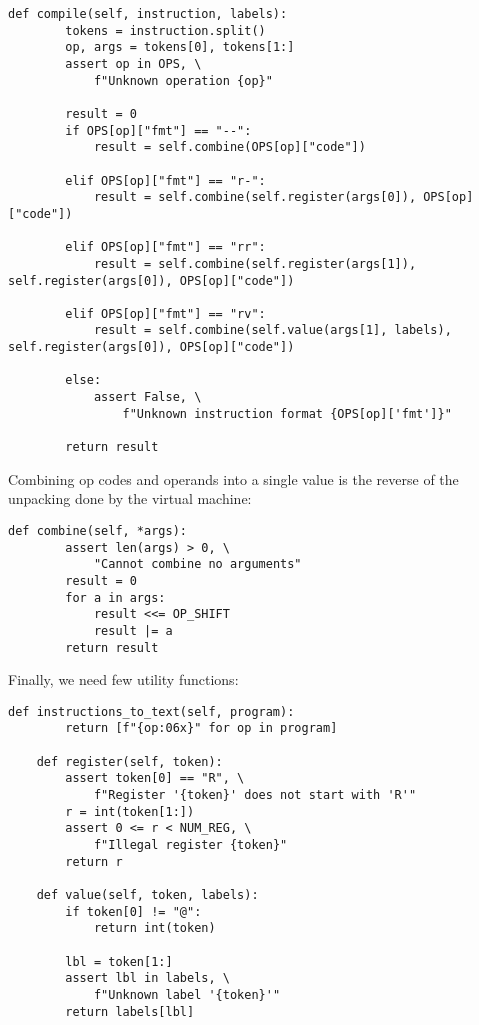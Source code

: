 \documentclass{scrbook}
\begin{document}
\begin{lstlisting}[frame=single,frameround=tttt]
    def compile(self, instruction, labels):
        tokens = instruction.split()
        op, args = tokens[0], tokens[1:]
        assert op in OPS, \
            f"Unknown operation {op}"

        result = 0
        if OPS[op]["fmt"] == "--":
            result = self.combine(OPS[op]["code"])

        elif OPS[op]["fmt"] == "r-":
            result = self.combine(self.register(args[0]), OPS[op]["code"])

        elif OPS[op]["fmt"] == "rr":
            result = self.combine(self.register(args[1]), self.register(args[0]), OPS[op]["code"])

        elif OPS[op]["fmt"] == "rv":
            result = self.combine(self.value(args[1], labels), self.register(args[0]), OPS[op]["code"])

        else:
            assert False, \
                f"Unknown instruction format {OPS[op]['fmt']}"

        return result
\end{lstlisting}



Combining op codes and operands into a single value
is the reverse of the unpacking done by the virtual machine:


\begin{lstlisting}[frame=single,frameround=tttt]
    def combine(self, *args):
        assert len(args) > 0, \
            "Cannot combine no arguments"
        result = 0
        for a in args:
            result <<= OP_SHIFT
            result |= a
        return result
\end{lstlisting}



Finally, we need few utility functions:


\begin{lstlisting}[frame=single,frameround=tttt]
    def instructions_to_text(self, program):
        return [f"{op:06x}" for op in program]

    def register(self, token):
        assert token[0] == "R", \
            f"Register '{token}' does not start with 'R'"
        r = int(token[1:])
        assert 0 <= r < NUM_REG, \
            f"Illegal register {token}"
        return r

    def value(self, token, labels):
        if token[0] != "@":
            return int(token)

        lbl = token[1:]
        assert lbl in labels, \
            f"Unknown label '{token}'"
        return labels[lbl]
\end{lstlisting}
\end{document}

